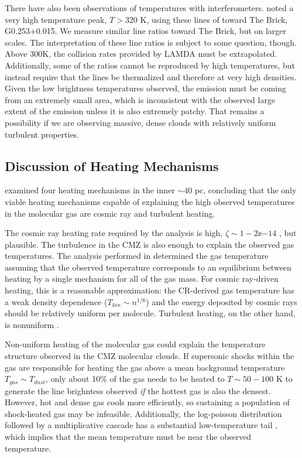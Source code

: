 There have also been observations of \para temperatures with interferometers.
\citet{Johnston2014a} noted a very high temperature peak, $T>320$ K, using these
lines of \para toward The Brick, G0.253+0.015.  We measure similar line
ratios toward The Brick, but on larger scales.  The interpretation of these
line ratios is subject to some question, though.  Above 300K, the collision
rates provided by LAMDA \citep{Green1991a,Schoier2005a,Wiesenfeld2013a} must be
extrapolated.  Additionally, some of the ratios cannot be reproduced by high
temperatures, but instead require that the lines be thermalized and therefore
at very high densities.   Given the low brightness temperatures observed,
the emission must be coming from an extremely small area, which is inconsistent
with the observed large extent of the emission unless it is also extremely
patchy.  That remains a possibility if we are observing massive, dense clouds
with relatively uniform turbulent properties.



\subsection{Discussion of Heating Mechanisms}
\citet{Ao2013a} examined four heating mechanisms in the inner $\sim 40$ pc,
concluding that the only viable heating mechanisms capable of explaining the
high observed temperatures in the molecular gas are cosmic ray and turbulent
heating.  

The cosmic ray heating rate required by the \citet{Ao2013a} analysis is high,
$\zeta\sim1-2\ee{-14}$ \pers, but plausible.  The turbulence in the CMZ is also
enough to explain the observed gas temperatures. 
The analysis performed in \citet{Ao2013a} determined the gas temperature
assuming that the observed temperature corresponds to an equilibrium between
heating by a single mechanism for all of the gas mass.  For cosmic ray-driven
heating, this is a reasonable approximation: the CR-derived gas temperature
has a weak density dependence ($T_{kin}\sim n^{1/6}$) and the energy deposited
by cosmic rays should be relatively uniform per molecule.  Turbulent heating,
on the other hand, is nonuniform \citep{Pan2009a}.

Non-uniform heating of the molecular gas could explain the temperature
structure observed in the CMZ molecular clouds.  If supersonic shocks within
the gas are responsible for heating the gas above a mean background temperature
$T_{gas} \sim T_{dust}$, only about 10\% of the gas needs to be heated to
$T\sim50-100$ K to generate the line brighntess observed \emph{if} the hottest
gas is also the densest.  However, hot and dense gas cools more efficiently, so
sustaining a population of shock-heated gas may be infeasible.  Additionally,
the log-poisson distribution followed by a multiplicative cascade has a substantial
low-temperature tail \citep{Pan2009a}, which implies that the mean temperature
must be near the observed temperature.  

